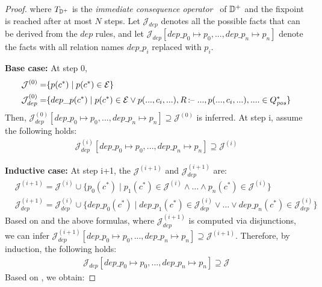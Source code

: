 \documentclass[acmsmall,screen,review,anonymous,nonacm]{acmart}
\begin{document}
\begin{lemma}
{\begin{proof}
\noindent where $T_{\mathbb{D}^+}$ is the \emph{immediate consequence operator}~\cite{DBLP:books/aw/AbiteboulHV95} of $\mathbb{D}^+$ and the fixpoint is reached after at most $N$ steps.
Let $\mathcal{J}_{dep}$ denotes all the possible facts that can be derived from the $dep$ rules, and let $\mathcal{J}_{dep}[dep\_{p_0} \mapsto p_0,...,dep\_{p_n} \mapsto p_n]$ denote the facts with all relation names $dep\_{p_i}$ replaced with $p_i$. 

\noindent
\textbf{Base case:} 
At step 0, 
\begin{align*}
    \mathcal{J}^{(0)} = &\{p(c^*) \mid p(c^*) \in \mathcal{E} \} \\
    \mathcal{J}_{dep}^{(0)} = &\{dep\_{p}(c^*) \mid p(c^*) \in \mathcal{E} \vee p(...,c_i,...), R \,\text{:--}\, \,...,p(..., c_i, ...), .... \in Q^{*}_{\mathit{pos}}  \}
\end{align*}
Then, $\mathcal{J}_{dep}^{(0)}[dep\_{p_0} \mapsto p_0,...,dep\_{p_n} \mapsto p_n] \supseteq \mathcal{J}^{(0)}$ is inferred.
At step i, assume the following holds:
\begin{align}
\mathcal{J}_{dep}^{(i)}[dep\_{p_0} \mapsto p_0,...,dep\_{p_n} \mapsto p_n] \supseteq \mathcal{J}^{(i)}
\label{eq:assumption}
\end{align}

\noindent 
\textbf{Inductive case:} 
At step i+1, the $\mathcal{J}^{(i+1)}$ and $\mathcal{J}_{dep}^{(i+1)}$ are:
\begin{align*}
    & \mathcal{J}^{(i+1)} = \mathcal{J}^{(i)} \cup \{p_0(c^*) \mid p_1(c^*) \in \mathcal{J}^{(i)} \wedge \dots \wedge p_n(c^*) \in \mathcal{J}^{(i)} \} \\
    & \mathcal{J}_{dep}^{(i+1)} = \mathcal{J}_{dep}^{(i)} \cup \{dep\_{p_0}(c^*) \mid dep\_{p_1}(c^*) \in \mathcal{J}_{dep}^{(i)} \vee \dots \vee dep\_{p_n}(c^*) \in \mathcal{J}_{dep}^{(i)} \}
\end{align*}
Based on  and the above formulas, where $\mathcal{J}_{dep}^{(i+1)}$ is computed via disjunctions, we can infer $\mathcal{J}_{dep}^{(i+1)}[dep\_{p_0} \mapsto p_0,...,dep\_{p_n} \mapsto p_n] \supseteq \mathcal{J}^{(i+1)}$.
Therefore, by induction, the following holds:
\begin{align}
\mathcal{J}_{dep}[dep\_{p_0} \mapsto p_0,...,dep\_{p_n} \mapsto p_n] \supseteq \mathcal{J}
\label{eq:conclusion}
\end{align}
Based on , we obtain:


\end{proof}}
\end{lemma}
\end{document}
